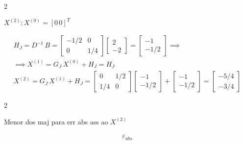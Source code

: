 \documentclass[./CN_A-Tests_Resolutions.tex]{subfiles}
\begin{document}
\begin{questionBox}2{} %

  \(X^{(2)}:X^{(0)}=[0\,0]^T\)

  \answer{}

  \begin{gather*}
    H_J=D^{-1}\,B
    =\begin{bmatrix}
      -1/2 & 0
      \\0 & 1/4
    \end{bmatrix}
    \begin{bmatrix}
      2\\-2
    \end{bmatrix}
    = \begin{bmatrix}
      -1\\-1/2
    \end{bmatrix}
    \implies \\
    \implies
    X^{(1)}
    = G_J\,X^{(0)}+H_J
    = H_J
    \\[1ex]
    X^{(2)}
    = G_J\,X^{(1)}+H_J
    =\begin{bmatrix}
      0 & 1/2
      \\1/4 & 0
    \end{bmatrix}
    \begin{bmatrix}
      -1\\-1/2
    \end{bmatrix}
    + \begin{bmatrix}
      -1\\-1/2
    \end{bmatrix}
    =\begin{bmatrix}
      -5/4 \\ -3/4
    \end{bmatrix}
  \end{gather*}

\end{questionBox}

\begin{questionBox}2{} %

  Menor dos maj para err abs ass ao \(X^{(2)}\)

  \answer{}

  \begin{gather*}
    \varepsilon_{abs}
  \end{gather*}

\end{questionBox}
\end{document}
